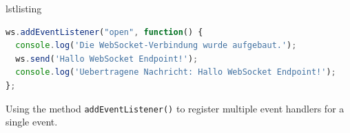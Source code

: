 \documentclass[a4paper, justified, notoc]{tufte-handout} %
\makeatletter
\newenvironment{listing}[1][htbp] %
  {\ifvmode\else\unskip\fi\begin{@tufte@float}[#1]{lstlisting}{}}
  {\end{@tufte@float} } %
\makeatother
\begin{document}
\begin{listing} %
\begin{lstlisting}[language=JavaScript]
ws.addEventListener("open", function() {
  console.log('Die WebSocket-Verbindung wurde aufgebaut.'); 
  ws.send('Hallo WebSocket Endpoint!');
  console.log('Uebertragene Nachricht: Hallo WebSocket Endpoint!');
};
\end{lstlisting}
	\caption{Using the method \texttt{addEventListener()} to register multiple event handlers for a single event.}
	\label{alternative}
\end{listing}


%
%
%
%
%
%
%
\end{document}

